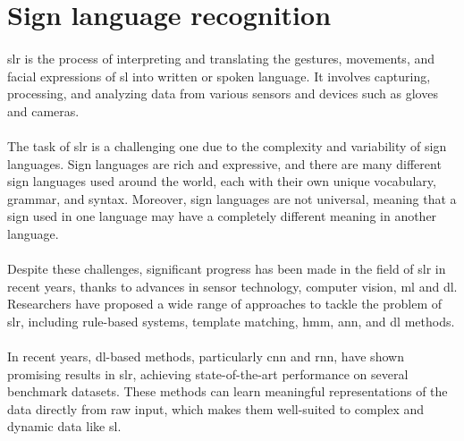 \section{Sign language recognition}
\paragraph{}
\ac{slr} is the process of interpreting and translating the gestures, movements, and facial expressions of \ac{sl} into written or spoken language. It involves capturing, processing, and analyzing data from various sensors and devices such as gloves and cameras.
\paragraph{}
The task of \ac{slr} is a challenging one due to the complexity and variability of sign languages. Sign languages are rich and expressive, and there are many different sign languages used around the world, each with their own unique vocabulary, grammar, and syntax. Moreover, sign languages are not universal, meaning that a sign used in one language may have a completely different meaning in another language.
\paragraph{}
Despite these challenges, significant progress has been made in the field of \ac{slr} in recent years, thanks to advances in sensor technology, computer vision, \ac{ml} and \ac{dl}. Researchers have proposed a wide range of approaches to tackle the problem of \ac{slr}, including rule-based systems, template matching, \ac{hmm}, \ac{ann}, and \ac{dl} methods.
\paragraph{}
In recent years, \ac{dl}-based methods, particularly \ac{cnn} and \ac{rnn}, have shown promising results in \ac{slr}, achieving state-of-the-art performance on several benchmark datasets. These methods can learn meaningful representations of the data directly from raw input, which makes them well-suited to complex and dynamic data like \ac{sl}.